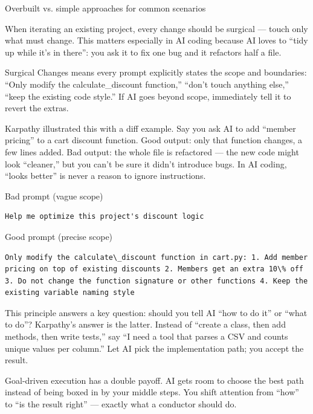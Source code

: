 \begin{center}\small\color{gray}Overbuilt vs. simple approaches for common scenarios\end{center}


When iterating an existing project, every change should be surgical — touch only what must change. This matters especially in AI coding because AI loves to “tidy up while it's in there”: you ask it to fix one bug and it refactors half a file.

Surgical Changes means every prompt explicitly states the scope and boundaries: “Only modify the calculate\_discount function,” “don't touch anything else,” “keep the existing code style.” If AI goes beyond scope, immediately tell it to revert the extras.

Karpathy illustrated this with a diff example. Say you ask AI to add “member pricing” to a cart discount function. Good output: only that function changes, a few lines added. Bad output: the whole file is refactored — the new code might look “cleaner,” but you can't be sure it didn't introduce bugs. In AI coding, “looks better” is never a reason to ignore instructions.

Bad prompt (vague scope)

\begin{lstlisting}
Help me optimize this project's discount logic
\end{lstlisting}

Good prompt (precise scope)

\begin{lstlisting}
Only modify the calculate\_discount function in cart.py: 1. Add member pricing on top of existing discounts 2. Members get an extra 10\% off 3. Do not change the function signature or other functions 4. Keep the existing variable naming style
\end{lstlisting}


This principle answers a key question: should you tell AI “how to do it” or “what to do”? Karpathy's answer is the latter. Instead of “create a class, then add methods, then write tests,” say “I need a tool that parses a CSV and counts unique values per column.” Let AI pick the implementation path; you accept the result.

Goal-driven execution has a double payoff. AI gets room to choose the best path instead of being boxed in by your middle steps. You shift attention from “how” to “is the result right” — exactly what a conductor should do.

